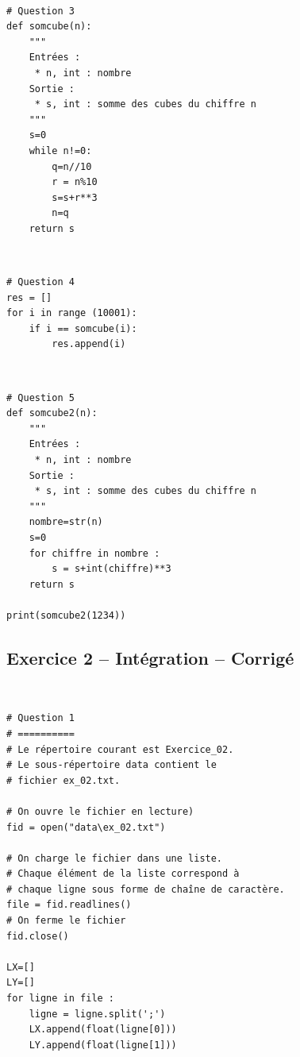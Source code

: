 \documentclass[10pt,fleqn]{article} %
\begin{document}
\begin{corrige}
$\quad$
\begin{lstlisting}
# Question 3
def somcube(n):
    """
    Entrées :
     * n, int : nombre
    Sortie : 
     * s, int : somme des cubes du chiffre n
    """
    s=0
    while n!=0:
        q=n//10
        r = n%10
        s=s+r**3
        n=q
    return s
\end{lstlisting}
\end{corrige}

\begin{corrige}
$\quad$
\begin{lstlisting}
# Question 4
res = []
for i in range (10001):
    if i == somcube(i):
        res.append(i)
\end{lstlisting}
\end{corrige}

\begin{corrige}
$\quad$
\begin{lstlisting}
# Question 5
def somcube2(n):
    """
    Entrées :
     * n, int : nombre
    Sortie : 
     * s, int : somme des cubes du chiffre n
    """
    nombre=str(n)
    s=0
    for chiffre in nombre :
        s = s+int(chiffre)**3
    return s
    
print(somcube2(1234))
\end{lstlisting}
\end{corrige}



\subsection*{Exercice 2 -- Intégration -- Corrigé}

\begin{corrige}
$\quad$
\begin{lstlisting}
# Question 1
# ==========
# Le répertoire courant est Exercice_02.
# Le sous-répertoire data contient le
# fichier ex_02.txt.

# On ouvre le fichier en lecture)
fid = open("data\ex_02.txt")

# On charge le fichier dans une liste.
# Chaque élément de la liste correspond à 
# chaque ligne sous forme de chaîne de caractère.
file = fid.readlines()
# On ferme le fichier
fid.close()

LX=[]
LY=[]
for ligne in file :
    ligne = ligne.split(';')
    LX.append(float(ligne[0]))
    LY.append(float(ligne[1]))
\end{lstlisting}
\end{corrige}
\end{document}
